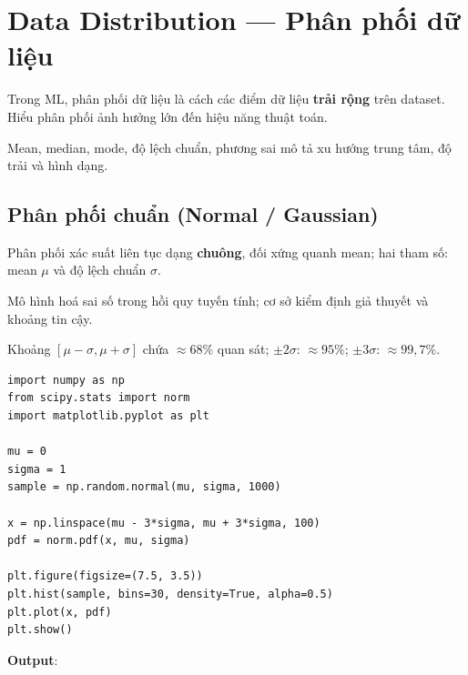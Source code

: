 \section{Data Distribution --- Phân phối dữ liệu}
\label{sec:data-distribution}

\begin{dinhnghia}[title={Phân phối dữ liệu}]
Trong ML, phân phối dữ liệu là cách các điểm dữ liệu \textbf{trải rộng} trên dataset.
Hiểu phân phối ảnh hưởng lớn đến hiệu năng thuật toán.
\end{dinhnghia}

\begin{ynghia}[title={Đại lượng mô tả}]
Mean, median, mode, độ lệch chuẩn, phương sai mô tả xu hướng trung tâm, độ trải và hình dạng.
\end{ynghia}

\subsection{Phân phối chuẩn (Normal / Gaussian)}

\begin{dinhnghia}[title={Normal distribution}]
Phân phối xác suất liên tục dạng \textbf{chuông}, đối xứng quanh mean; hai tham số: mean $\mu$ và độ lệch chuẩn $\sigma$.
\end{dinhnghia}

\begin{phuongphap}[title={Ứng dụng trong ML}]
Mô hình hoá sai số trong hồi quy tuyến tính; cơ sở kiểm định giả thuyết và khoảng tin cậy.
\end{phuongphap}

\begin{ynghia}[title={Quy tắc 68--95--99.7}]
Khoảng $[\mu-\sigma, \mu+\sigma]$ chứa $\approx 68\%$ quan sát; $\pm 2\sigma$: $\approx 95\%$; $\pm 3\sigma$: $\approx 99{,}7\%$.
\end{ynghia}

\begin{vidu}[title={Sinh mẫu và vẽ PDF (scipy.stats)}]
\begin{lstlisting}
import numpy as np
from scipy.stats import norm
import matplotlib.pyplot as plt

mu = 0
sigma = 1
sample = np.random.normal(mu, sigma, 1000)

x = np.linspace(mu - 3*sigma, mu + 3*sigma, 100)
pdf = norm.pdf(x, mu, sigma)

plt.figure(figsize=(7.5, 3.5))
plt.hist(sample, bins=30, density=True, alpha=0.5)
plt.plot(x, pdf)
plt.show()
\end{lstlisting}

\textbf{Output}:
\end{vidu}

